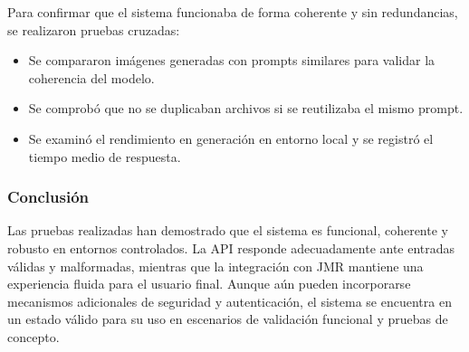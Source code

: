 Para confirmar que el sistema funcionaba de forma coherente y sin redundancias, se realizaron pruebas cruzadas:

\begin{itemize}
    \item Se compararon imágenes generadas con prompts similares para validar la coherencia del modelo.
    \item Se comprobó que no se duplicaban archivos si se reutilizaba el mismo prompt.
    \item Se examinó el rendimiento en generación en entorno local y se registró el tiempo medio de respuesta.
\end{itemize}

\subsubsection{Conclusión}

Las pruebas realizadas han demostrado que el sistema es funcional, coherente y robusto en entornos controlados. La API responde adecuadamente ante entradas válidas y malformadas, mientras que la integración con JMR mantiene una experiencia fluida para el usuario final. Aunque aún pueden incorporarse mecanismos adicionales de seguridad y autenticación, el sistema se encuentra en un estado válido para su uso en escenarios de validación funcional y pruebas de concepto.
